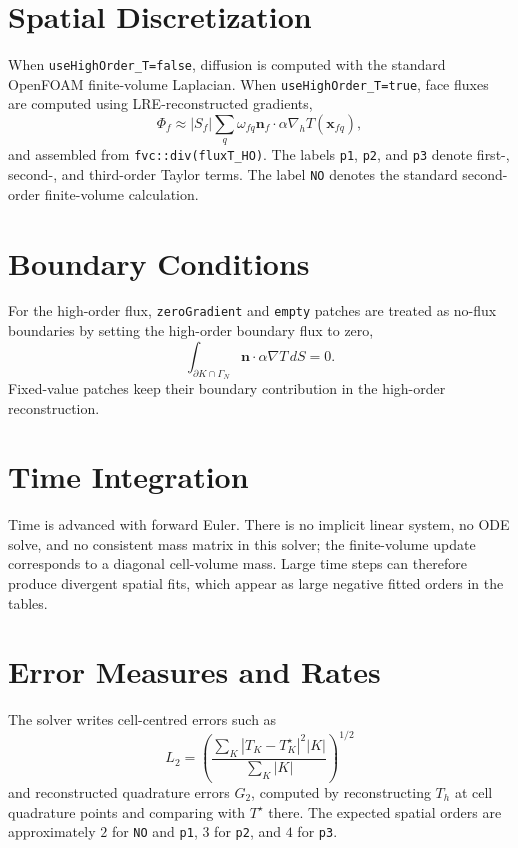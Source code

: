 \documentclass[11pt,a4paper]{article}
\newcommand{\code}[1]{\texttt{#1}}
\begin{document}
\section{Spatial Discretization}
When \code{useHighOrder\_T=false}, diffusion is computed with the standard OpenFOAM finite-volume Laplacian. When \code{useHighOrder\_T=true}, face fluxes are computed using LRE-reconstructed gradients,
\begin{equation}
\Phi_f\approx |S_f|\sum_q\omega_{fq}\mathbf{n}_f\cdot\alpha\nabla_hT(\mathbf{x}_{fq}),
\end{equation}
and assembled from \code{fvc::div(fluxT\_HO)}. The labels \code{p1}, \code{p2}, and \code{p3} denote first-, second-, and third-order Taylor terms. The label \code{NO} denotes the standard second-order finite-volume calculation.
\section{Boundary Conditions}
For the high-order flux, \code{zeroGradient} and \code{empty} patches are treated as no-flux boundaries by setting the high-order boundary flux to zero,
\begin{equation}
\int_{\partial K\cap\Gamma_N}\mathbf{n}\cdot\alpha\nabla T\,dS=0.
\end{equation}
Fixed-value patches keep their boundary contribution in the high-order reconstruction.
\section{Time Integration}
Time is advanced with forward Euler. There is no implicit linear system, no ODE solve, and no consistent mass matrix in this solver; the finite-volume update corresponds to a diagonal cell-volume mass. Large time steps can therefore produce divergent spatial fits, which appear as large negative fitted orders in the tables.
\section{Error Measures and Rates}
The solver writes cell-centred errors such as
\begin{equation}
L_2=\left(\frac{\sum_K |T_K-T_K^\star|^2 |K|}{\sum_K |K|}\right)^{1/2}
\end{equation}
and reconstructed quadrature errors $G_2$, computed by reconstructing $T_h$ at cell quadrature points and comparing with $T^\star$ there. The expected spatial orders are approximately $2$ for \code{NO} and \code{p1}, $3$ for \code{p2}, and $4$ for \code{p3}.
\end{document}
